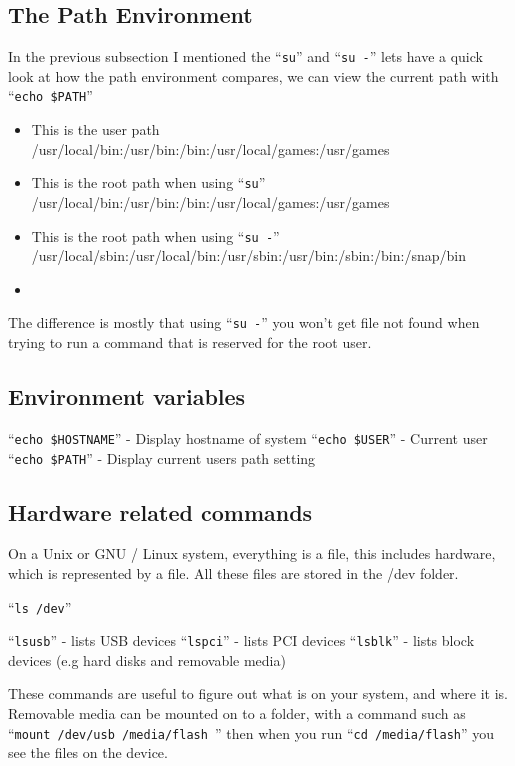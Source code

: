 \documentclass{extbook}
\begin{document}
\subsection{The Path Environment}
 In the previous subsection I mentioned the ``\verb|su|'' and ``\verb|su -|'' lets have a quick look at how the path environment compares, we can view the current path with ``\verb|echo $PATH|''
\begin{itemize}
\item This is the user path /usr/local/bin:/usr/bin:/bin:/usr/local/games:/usr/games
\item This is the root path when using ``\verb|su|'' /usr/local/bin:/usr/bin:/bin:/usr/local/games:/usr/games
\item This is the root path when using ``\verb|su -|'' /usr/local/sbin:/usr/local/bin:/usr/sbin:/usr/bin:/sbin:/bin:/snap/bin
\item
\end{itemize}

The difference is mostly that using ``\verb|su -|'' you won't get file not found when trying to run a command that is reserved for the root user.

\subsection{Environment variables}

``\verb|echo $HOSTNAME|'' - Display hostname of system
``\verb|echo $USER|'' - Current user
``\verb|echo $PATH|'' - Display current users path setting

\subsection{Hardware related commands}

On a Unix or GNU / Linux system, everything is a file, this includes hardware, which is represented by a file. All these files are stored in the /dev folder.

``\verb|ls /dev|''

``\verb|lsusb|'' - lists USB devices
``\verb|lspci|'' - lists PCI devices
``\verb|lsblk|'' - lists block devices (e.g hard disks and removable media)

These commands are useful to figure out what is on your system, and where it is. Removable media can be mounted on to a folder, with a command such as ``\verb|mount /dev/usb /media/flash |''  then when you run ``\verb|cd /media/flash|'' you see the files on the device.
\end{document}
